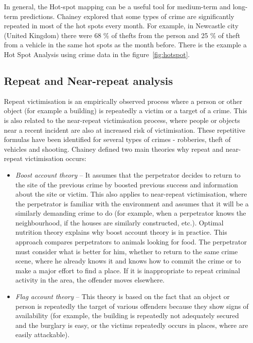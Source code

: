 \documentclass[thesis=M,english]{FITthesis}[2012/10/20]
\begin{document}
In general, the Hot-spot mapping can be a useful tool for medium-term and long-term predictions. Chainey explored that some types of crime are significantly repeated in most of the hot spots every month\cite[38]{Chainey2015maps}. For example, in Newcastle city (United Kingdom) there were 68 \% of thefts from the person and 25 \% of theft from a vehicle in the same hot spots as the month before. There is the example a Hot Spot Analysis using crime data in the figure~\ref{fig:hotspot}. 

\subsection{Repeat and Near-repeat analysis}

Repeat victimisation is an empirically observed process where a person or other object (for example a building) is repeatedly a victim or a target of a crime. This is also related to the near-repeat victimisation process, where people or objects near a recent incident are also at increased risk of victimisation. These repetitive formulas have been identified for several types of crimes - robberies, theft of vehicles and shooting.\cite{Chainey2016repeat} Chainey defined two main theories why repeat and near-repeat victimisation occurs\cite{Chainey2016repeat}:

\begin{itemize}
\item \textit{Boost account theory} -- It assumes that the perpetrator decides to return to the site of the previous crime by boosted previous success and information about the site or victim. This also applies to near-repeat victimisation, where the perpetrator is familiar with the environment and assumes that it will be a similarly demanding crime to do (for example, when a perpetrator knows the neighbourhood, if the houses are similarly constructed, etc.). Optimal nutrition theory explains why boost account theory is in practice. This approach compares perpetrators to animals looking for food. The perpetrator must consider what is better for him, whether to return to the same crime scene, where he already knows it and knows how to commit the crime or to make a major effort to find a place. If it is inappropriate to repeat criminal activity in the area, the offender moves elsewhere.
\item \textit{Flag account theory} -- This theory is based on the fact that an object or person is repeatedly the target of various offenders because they show signs of availability (for example, the building is repeatedly not adequately secured and the burglary is easy, or the victims repeatedly occurs in places, where are easily attackable).\cite{Chainey2016repeat}
\end{itemize}
\end{document}
